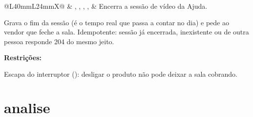 \begin{tabularx}{\linewidth}{@{}L{40mm}L{24mm}X@{}}
 & , , , ,  & Encerra a sessão de vídeo da Ajuda.\par Grava o fim da sessão (é o tempo real que passa a contar no dia) e pede ao vendor que feche a sala. Idempotente: sessão já encerrada, inexistente ou de outra pessoa responde 204 do mesmo jeito.\par \textbf{Restrições:}\par \hspace*{1em}\textbullet{} Escapa do interruptor (): desligar o produto não pode deixar a sala cobrando.\\
\bottomrule
\end{tabularx}

\section{analise}

